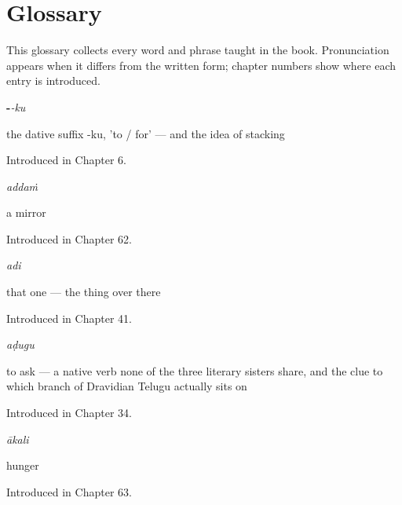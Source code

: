 
\chapter*{Glossary}

This glossary collects every word and phrase taught in the book. Pronunciation appears when it differs from the written form; chapter numbers show where each entry is introduced.

\noindent\begin{minipage}[t]{\linewidth}
\raggedright
\textbf{-}\enspace\emph{-ku}\par
\small the dative suffix -ku, 'to / for' — and the idea of stacking\par
\footnotesize Introduced in Chapter 6.
\end{minipage}\par\medskip

\noindent\begin{minipage}[t]{\linewidth}
\raggedright
\textbf{}\enspace\emph{addaṁ}\par
\small a mirror\par
\footnotesize Introduced in Chapter 62.
\end{minipage}\par\medskip

\noindent\begin{minipage}[t]{\linewidth}
\raggedright
\textbf{}\enspace\emph{adi}\par
\small that one — the thing over there\par
\footnotesize Introduced in Chapter 41.
\end{minipage}\par\medskip

\noindent\begin{minipage}[t]{\linewidth}
\raggedright
\textbf{}\enspace\emph{aḍugu}\par
\small to ask — a native verb none of the three literary sisters share, and the clue to which branch of Dravidian Telugu actually sits on\par
\footnotesize Introduced in Chapter 34.
\end{minipage}\par\medskip

\noindent\begin{minipage}[t]{\linewidth}
\raggedright
\textbf{}\enspace\emph{ākali}\par
\small hunger\par
\footnotesize Introduced in Chapter 63.
\end{minipage}\par\medskip

